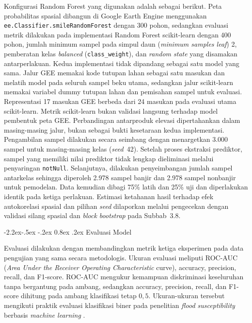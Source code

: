 \documentclass[12pt,a4paper]{article}
\makeatletter
\renewcommand\subsection{\@startsection{subsection}{2}{\z@}%
  {-2.2ex\@plus -.5ex \@minus -.2ex}%
  {0.8ex \@plus .2ex}%
  {\normalfont\normalsize\bfseries}}
\makeatother
\begin{document}
Konfigurasi Random Forest yang digunakan adalah sebagai berikut. Peta
probabilitas spasial dibangun di Google Earth Engine menggunakan
\texttt{ee.Classifier.smileRandomForest} dengan 300 pohon, sedangkan
evaluasi metrik dilakukan pada implementasi Random Forest scikit-learn
dengan 400 pohon, jumlah minimum sampel pada simpul daun
(\textit{minimum samples leaf}) 2,
pemberatan kelas \textit{balanced} (\texttt{class\_weight}), dan
\textit{random state} yang disamakan antarperlakuan. Kedua implementasi
tidak dipandang sebagai satu model yang sama. Jalur GEE memakai kode tutupan
lahan sebagai satu masukan dan melatih model pada seluruh
sampel beku utama, sedangkan jalur scikit-learn memakai variabel dummy
tutupan lahan dan pemisahan sampel untuk evaluasi. Representasi 17 masukan GEE berbeda dari 24 masukan pada evaluasi utama
scikit-learn. Metrik scikit-learn bukan validasi langsung terhadap
model pembentuk peta GEE. Perbandingan antarproduk elevasi dipertahankan
dalam masing-masing jalur, bukan sebagai bukti kesetaraan kedua implementasi.
Pengambilan sampel dilakukan secara seimbang dengan menargetkan 3.000 sampel
untuk masing-masing kelas (\textit{seed}~42). Setelah proses ekstraksi
prediktor, sampel yang memiliki nilai prediktor tidak lengkap dieliminasi
melalui penyaringan \texttt{notNull}. Selanjutnya, dilakukan penyeimbangan
jumlah sampel antarkelas sehingga diperoleh 2.978 sampel banjir dan 2.978
sampel nonbanjir untuk pemodelan. Data kemudian dibagi 75\% latih dan 25\%
uji dan diperlakukan identik pada
ketiga perlakuan. Estimasi ketahanan hasil terhadap efek autokorelasi
spasial dan pilihan \textit{seed} dilaporkan melalui pengecekan dengan
validasi silang spasial dan \textit{block bootstrap} pada Subbab~3.8.

\subsection{Evaluasi Model}

Evaluasi dilakukan dengan membandingkan metrik ketiga eksperimen pada data
pengujian yang sama secara metodologis. Ukuran evaluasi meliputi ROC-AUC
(\textit{Area Under the Receiver Operating Characteristic} curve),
accuracy, precision, recall, dan F1-score. ROC-AUC mengukur kemampuan
diskriminasi keseluruhan tanpa bergantung pada ambang, sedangkan accuracy,
precision, recall, dan F1-score dihitung pada ambang klasifikasi tetap
$0{,}5$. Ukuran-ukuran tersebut mengikuti praktik evaluasi klasifikasi biner
pada penelitian \textit{flood susceptibility} berbasis \textit{machine
learning} \citep{hakim2026}.
\end{document}
